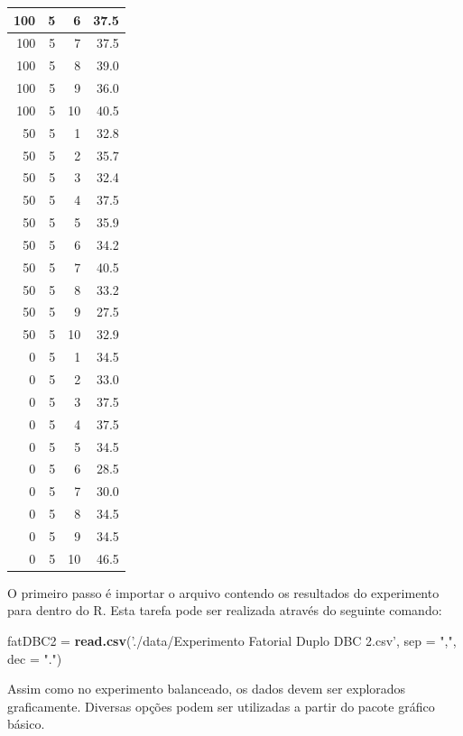 \documentclass[
]{article}
\newenvironment{Shaded}{\begin{snugshade}}{\end{snugshade}}
\newcommand{\DataTypeTok}[1]{\textcolor[rgb]{0.13,0.29,0.53}{#1}}
\newcommand{\KeywordTok}[1]{\textcolor[rgb]{0.13,0.29,0.53}{\textbf{#1}}}
\newcommand{\NormalTok}[1]{#1}
\newcommand{\StringTok}[1]{\textcolor[rgb]{0.31,0.60,0.02}{#1}}
\begin{document}
\begin{table}
\begin{tabular}[t]{r|r|r|r}
\hline
100 & 5 & 6 & 37.5\\
\hline
100 & 5 & 7 & 37.5\\
\hline
100 & 5 & 8 & 39.0\\
\hline
100 & 5 & 9 & 36.0\\
\hline
100 & 5 & 10 & 40.5\\
\hline
50 & 5 & 1 & 32.8\\
\hline
50 & 5 & 2 & 35.7\\
\hline
50 & 5 & 3 & 32.4\\
\hline
50 & 5 & 4 & 37.5\\
\hline
50 & 5 & 5 & 35.9\\
\hline
50 & 5 & 6 & 34.2\\
\hline
50 & 5 & 7 & 40.5\\
\hline
50 & 5 & 8 & 33.2\\
\hline
50 & 5 & 9 & 27.5\\
\hline
50 & 5 & 10 & 32.9\\
\hline
0 & 5 & 1 & 34.5\\
\hline
0 & 5 & 2 & 33.0\\
\hline
0 & 5 & 3 & 37.5\\
\hline
0 & 5 & 4 & 37.5\\
\hline
0 & 5 & 5 & 34.5\\
\hline
0 & 5 & 6 & 28.5\\
\hline
0 & 5 & 7 & 30.0\\
\hline
0 & 5 & 8 & 34.5\\
\hline
0 & 5 & 9 & 34.5\\
\hline
0 & 5 & 10 & 46.5\\
\hline
\end{tabular}
\end{table}

O primeiro passo é importar o arquivo contendo os resultados do experimento para dentro do R. Esta tarefa pode ser realizada através do seguinte comando:

\begin{Shaded}
\begin{Highlighting}[]
\NormalTok{fatDBC2 =}\StringTok{ }\KeywordTok{read.csv}\NormalTok{(}\StringTok{'./data/Experimento Fatorial Duplo DBC 2.csv'}\NormalTok{, }
                   \DataTypeTok{sep =} \StringTok{","}\NormalTok{, }\DataTypeTok{dec =} \StringTok{"."}\NormalTok{)}
\end{Highlighting}
\end{Shaded}

Assim como no experimento balanceado, os dados devem ser explorados graficamente. Diversas opções podem ser utilizadas a partir do pacote gráfico básico.
\end{document}

